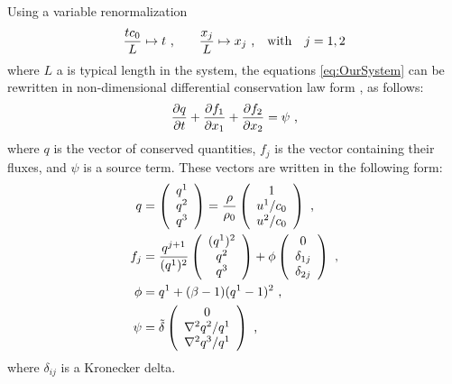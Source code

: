 Using a variable renormalization
\begin{align}
  \label{eq:renorm}
  \frac{t c_0}{L}  \mapsto t
  \ \text{,} \qquad
   \frac{x_j}{L} \mapsto  x_j
  \ \text{,} \quad \text{with} \quad
  j = 1,2
\end{align}
where $L$ a is typical length in the system, the equations \eqref{eq:OurSystem} can be rewritten in non-dimensional differential conservation law form \citep{sharma2010quasilinear}, as follows:
\begin{align}
  \label{eq:OurSysAdim}
  \frac{\partial q}{\partial t} + \frac{\partial f_1}{\partial x_1} + \frac{\partial f_2}{\partial x_2} = \psi \ \text{,}
\end{align}
where $q$ is the vector of conserved quantities, $f_j$ is the vector containing their fluxes, and $\psi$ is a source term. These vectors are written in the following form:
\begin{align*}
  q 
  &=
  \left(
    \begin{array}{c}
      q^1 \\
      q^2 \\
      q^3
    \end{array}
  \right)
  =
  \frac{\rho}{\rho_0}
  \left(
    \begin{array}{c}
      1 \\
      u^1/c_0 \\
      u^2/c_0
    \end{array}
  \right) \ \text{,}
 \\
  f_j
  &= \frac{q^{j+1}}{(q^1)^2}
  \left(
    \begin{array}{c}
      (q^1)^2 \\
      q^2 \\
      q^3
    \end{array}
  \right)
  + \phi 
  \left(
    \begin{array}{c}
      0 \\
      \delta_{1j} \\
      \delta_{2j}
    \end{array}
  \right) \ \text{,} \\
  \phi &= q^1 + (\beta-1)(q^1-1)^2 \ \text{,} \\
  \psi
  &=
  \tilde{\delta}
  \left(
    \begin{array}{c}
      0 \\
      \nabla^2 q^2/q^1 \\
      \nabla^2 q^3/q^1
    \end{array}
  \right) \ \text{,}
\end{align*}
where $\delta_{ij}$ is a Kronecker delta.

